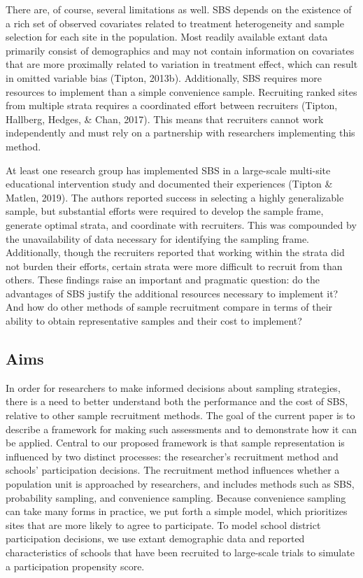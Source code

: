 \documentclass[english,man,floatsintext]{apa6}
\begin{document}
There are, of course, several limitations as well. SBS depends on the existence of a rich set of observed covariates related to treatment heterogeneity and sample selection for each site in the population. Most readily available extant data primarily consist of demographics and may not contain information on covariates that are more proximally related to variation in treatment effect, which can result in omitted variable bias (Tipton, 2013b). Additionally, SBS requires more resources to implement than a simple convenience sample. Recruiting ranked sites from multiple strata requires a coordinated effort between recruiters (Tipton, Hallberg, Hedges, \& Chan, 2017). This means that recruiters cannot work independently and must rely on a partnership with researchers implementing this method.

At least one research group has implemented SBS in a large-scale multi-site educational intervention study and documented their experiences (Tipton \& Matlen, 2019). The authors reported success in selecting a highly generalizable sample, but substantial efforts were required to develop the sample frame, generate optimal strata, and coordinate with recruiters.
This was compounded by the unavailability of data necessary for identifying the sampling frame.
Additionally, though the recruiters reported that working within the strata did not burden their efforts, certain strata were more difficult to recruit from than others.
These findings raise an important and pragmatic question: do the advantages of SBS justify the additional resources necessary to implement it?
And how do other methods of sample recruitment compare in terms of their ability to obtain representative samples and their cost to implement?

\hypertarget{aims}{%
\subsection{Aims}\label{aims}}

In order for researchers to make informed decisions about sampling strategies, there is a need to better understand both the performance and the cost of SBS, relative to other sample recruitment methods.
The goal of the current paper is to describe a framework for making such assessments and to demonstrate how it can be applied.
Central to our proposed framework is that sample representation is influenced by two distinct processes: the researcher's recruitment method and schools' participation decisions.
The recruitment method influences whether a population unit is approached by researchers, and includes methods such as SBS, probability sampling, and convenience sampling.
Because convenience sampling can take many forms in practice, we put forth a simple model, which prioritizes sites that are more likely to agree to participate.
To model school district participation decisions, we use extant demographic data and reported characteristics of schools that have been recruited to large-scale trials to simulate a participation propensity score.
\end{document}
